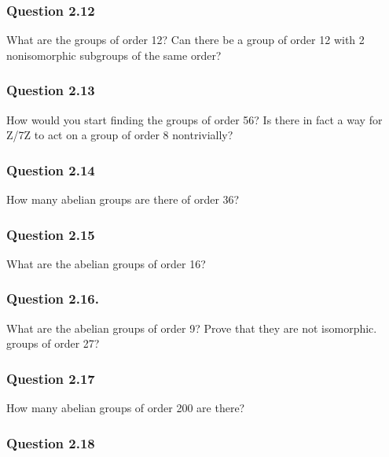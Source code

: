 \hypertarget{question-2.12}{%
\subsubsection{Question 2.12}\label{question-2.12}}

What are the groups of order 12? Can there be a group of order 12 with 2
nonisomorphic subgroups of the same order?

\hypertarget{question-2.13}{%
\subsubsection{Question 2.13}\label{question-2.13}}

How would you start finding the groups of order 56? Is there in fact a
way for Z/7Z to act on a group of order 8 nontrivially?

\hypertarget{question-2.14}{%
\subsubsection{Question 2.14}\label{question-2.14}}

How many abelian groups are there of order 36?

\hypertarget{question-2.15}{%
\subsubsection{Question 2.15}\label{question-2.15}}

What are the abelian groups of order 16?

\hypertarget{question-2.16.}{%
\subsubsection{Question 2.16.}\label{question-2.16.}}

What are the abelian groups of order 9? Prove that they are not
isomorphic. groups of order 27?

\hypertarget{question-2.17}{%
\subsubsection{Question 2.17}\label{question-2.17}}

How many abelian groups of order 200 are there?

\hypertarget{question-2.18}{%
\subsubsection{Question 2.18}\label{question-2.18}}

